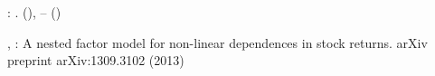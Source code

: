 \documentclass{article}
\begin{document}
\begin{thebibliography}{43}
\begin{barticle}
:
.
(),
--
()
\end{barticle}
\endbibitem

\begin{botherref}
,
:
A nested factor model for non-linear dependences in stock returns.
arXiv preprint arXiv:1309.3102
(2013)
\end{botherref}
\endbibitem

\end{thebibliography}

\newcommand{\BMCxmlcomment}[1]{}
\end{document}
